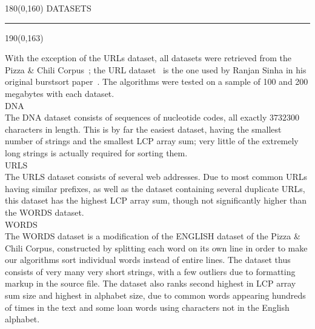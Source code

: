 %

\begin{textblock}{180}(0,160)
\sffamily\normalsize{\color{sciorange}DATASETS}\small\\
\rule[3mm]{190mm}{0.1pt}
\end{textblock} 
\begin{textblock}{190}(0,163)
 \footnotesize 
\begin{multicols}{3}
With the exception of the URLs dataset, all datasets were retrieved from
the Pizza \& Chili Corpus~\cite{fn2005}; the URL dataset~\cite{sinha} is the one used by Ranjan Sinha
in his original burstsort paper~\cite{sw2008}. The algorithms were tested on a sample
of 100 and 200 megabytes with each dataset.\vspace{1.5mm}\\
{\sffamily\normalsize{\color{sciorange}DNA}}\small\\
\footnotesize 
The DNA dataset consists of sequences of nucleotide codes, all exactly $3732300$
characters in length.  This is by far the easiest dataset, having the smallest
number of strings and the smallest LCP array sum; very little of the extremely
long strings is actually required for sorting them.\vspace{1.5mm}\\
{\sffamily\normalsize{\color{sciorange}URLS}}\small\\
\footnotesize 
The URLS dataset consists of several web addresses.  Due to most common URLs
having similar prefixes, as well as the dataset containing several duplicate
URLs, this dataset has the highest LCP array sum, though not significantly
higher than the WORDS dataset.\vspace{1.5mm}\\
{\sffamily\normalsize{\color{sciorange}WORDS}}\small\\
\footnotesize 
The WORDS dataset is a modification of the ENGLISH dataset of the Pizza \& Chili
Corpus, constructed by splitting each word on its own line in order to make our
algorithms sort individual words instead of entire lines.  The dataset thus
consists of very many very short strings, with a few outliers due to formatting
markup in the source file.  The dataset also ranks second highest in LCP array
sum size and highest in alphabet size, due to common words appearing hundreds of
times in the text and some loan words using characters not in the English
alphabet.

\end{multicols}

\end{textblock} 


